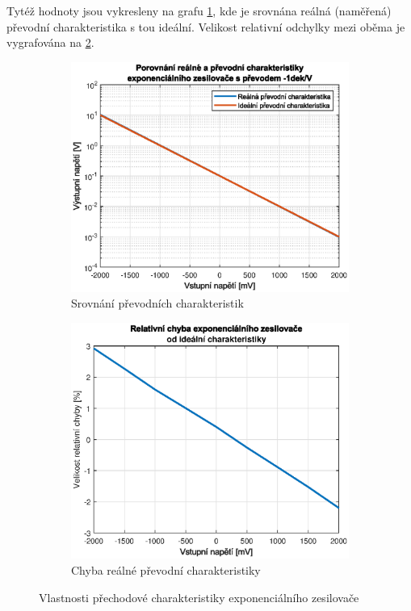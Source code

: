 \documentclass[twoside]{article}
\begin{document}
Tytéž hodnoty jsou vykresleny na grafu \ref{fig:prevod_char}, kde je srovnána reálná (naměřená) převodní charakteristika
s tou ideální. Velikost relativní odchylky mezi oběma je vygrafována na \ref{fig:chyba}.

\begin{figure}[h!]
    \centering
    \begin{subfigure}{0.48\textwidth}
        \centering
        \includegraphics[width=1\linewidth]{prevod.eps}
        \caption{Srovnání převodních charakteristik}
        \label{fig:prevod_char}
    \end{subfigure}
    \begin{subfigure}{0.48\textwidth}
        \centering
        \includegraphics[width=1\linewidth]{chyba.eps}
        \caption{Chyba reálné převodní charakteristiky}
        \label{fig:chyba}
    \end{subfigure}

    \caption{Vlastnosti přechodové charakteristiky exponenciálního zesilovače}
    \label{fig:step}
\end{figure}
\end{document}
